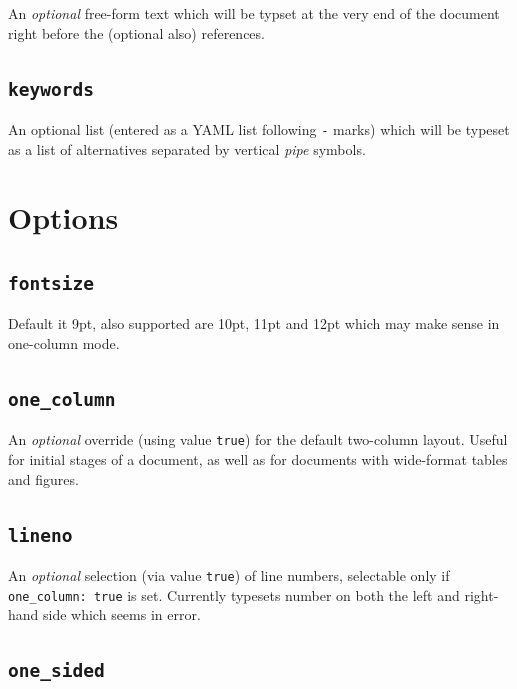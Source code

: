 \documentclass[letterpaper,9pt,twocolumn,twoside,]{pinp}
\begin{document}
An \emph{optional} free-form text which will be typset at the very end
of the document right before the (optional also) references.

\hypertarget{keywords}{%
\subsection{\texorpdfstring{\texttt{keywords}}{keywords}}\label{keywords}}

An optional list (entered as a YAML list following \texttt{-} marks)
which will be typeset as a list of alternatives separated by vertical
\emph{pipe} symbols.

\hypertarget{options}{%
\section{Options}\label{options}}

\hypertarget{fontsize}{%
\subsection{\texorpdfstring{\texttt{fontsize}}{fontsize}}\label{fontsize}}

Default it 9pt, also supported are 10pt, 11pt and 12pt which may make
sense in one-column mode.

\hypertarget{one_column}{%
\subsection{\texorpdfstring{\texttt{one\_column}}{one\_column}}\label{one_column}}

An \emph{optional} override (using value \texttt{true}) for the default
two-column layout. Useful for initial stages of a document, as well as
for documents with wide-format tables and figures.

\hypertarget{lineno}{%
\subsection{\texorpdfstring{\texttt{lineno}}{lineno}}\label{lineno}}

An \emph{optional} selection (via value \texttt{true}) of line numbers,
selectable only if \texttt{one\_column:\ true} is set. Currently
typesets number on both the left and right-hand side which seems in
error.

\hypertarget{one_sided}{%
\subsection{\texorpdfstring{\texttt{one\_sided}}{one\_sided}}\label{one_sided}}
\end{document}
